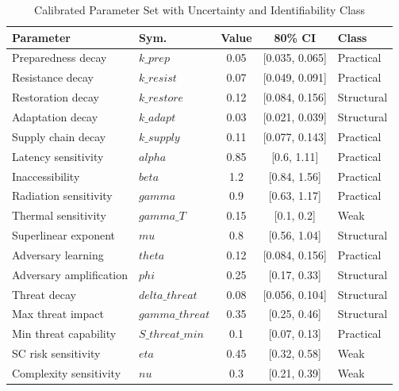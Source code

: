 \begin{table}[H]
\centering
\caption{Calibrated Parameter Set with Uncertainty and Identifiability Class}
\label{tab:params_live}
\scriptsize
\renewcommand{\arraystretch}{1.1}
\begin{tabular}{llccl}
\toprule
\textbf{Parameter} & \textbf{Sym.} & \textbf{Value} & \textbf{80\% CI} & \textbf{Class} \\
\midrule
Preparedness decay & $k\_prep$ & 0.05 & [0.035, 0.065] & Practical \\
Resistance decay & $k\_resist$ & 0.07 & [0.049, 0.091] & Practical \\
Restoration decay & $k\_restore$ & 0.12 & [0.084, 0.156] & Structural \\
Adaptation decay & $k\_adapt$ & 0.03 & [0.021, 0.039] & Structural \\
Supply chain decay & $k\_supply$ & 0.11 & [0.077, 0.143] & Practical \\
Latency sensitivity & $alpha$ & 0.85 & [0.6, 1.11] & Practical \\
Inaccessibility & $beta$ & 1.2 & [0.84, 1.56] & Practical \\
Radiation sensitivity & $gamma$ & 0.9 & [0.63, 1.17] & Practical \\
Thermal sensitivity & $gamma\_T$ & 0.15 & [0.1, 0.2] & Weak \\
Superlinear exponent & $mu$ & 0.8 & [0.56, 1.04] & Structural \\
Adversary learning & $theta$ & 0.12 & [0.084, 0.156] & Practical \\
Adversary amplification & $phi$ & 0.25 & [0.17, 0.33] & Structural \\
Threat decay & $delta\_threat$ & 0.08 & [0.056, 0.104] & Structural \\
Max threat impact & $gamma\_threat$ & 0.35 & [0.25, 0.46] & Structural \\
Min threat capability & $S\_threat\_min$ & 0.1 & [0.07, 0.13] & Practical \\
SC risk sensitivity & $eta$ & 0.45 & [0.32, 0.58] & Weak \\
Complexity sensitivity & $nu$ & 0.3 & [0.21, 0.39] & Weak \\
\bottomrule
\end{tabular}
\end{table}
